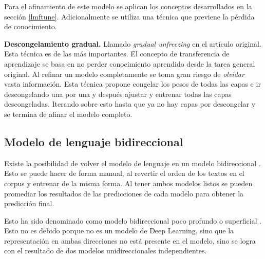Para el afinamiento de este modelo se aplican los conceptos desarrollados en la sección \ref{lmftune}. Adicionalmente se utiliza una técnica que previene la pérdida de conocimiento.

\textbf{Descongelamiento gradual.} Llamado \emph{gradual unfreezing} en el artículo original. Esta técnica es de las más importantes. El concepto de transferencia de aprendizaje se basa en no perder conocimiento aprendido desde la tarea general original. Al refinar un modelo completamente se toma gran riesgo de \emph{olvidar} vasta información. Esta técnica propone congelar los pesos de todas las capas e ir descongelando una por una y después ajustar y entrenar todas las capas descongeladas. Iterando sobre esto hasta que ya no hay capas por descongelar y se termina de afinar el modelo completo.

\subsection{Modelo de lenguaje bidireccional}

Existe la posibilidad de volver el modelo de lenguaje en un modelo bidireccional \parencite{howard2018}. Esto se puede hacer de forma manual, al revertir el orden de los textos en el corpus y entrenar de la misma forma. Al tener ambos modelos listos se pueden promediar los resultados de las predicciones de cada modelo para obtener la predicción final.

Esto ha sido denominado como modelo bidireccional poco profundo o superficial \parencite{devlin2018bert}. Esto no es debido porque no es un modelo de Deep Learning, sino que la representación en ambas direcciones no está presente en el modelo, sino se logra con el resultado de dos modelos unidireccionales independientes.

